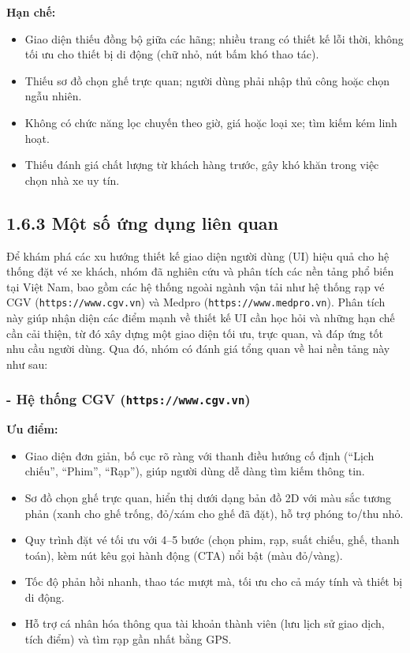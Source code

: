 \textbf{Hạn chế:}
\begin{itemize}
    \item Giao diện thiếu đồng bộ giữa các hãng; nhiều trang có thiết kế lỗi thời, không tối ưu cho thiết bị di động (chữ nhỏ, nút bấm khó thao tác).
    \item Thiếu sơ đồ chọn ghế trực quan; người dùng phải nhập thủ công hoặc chọn ngẫu nhiên.
    \item Không có chức năng lọc chuyến theo giờ, giá hoặc loại xe; tìm kiếm kém linh hoạt.
    \item Thiếu đánh giá chất lượng từ khách hàng trước, gây khó khăn trong việc chọn nhà xe uy tín.
\end{itemize}

\subsection*{1.6.3 Một số ứng dụng liên quan}

Để khám phá các xu hướng thiết kế giao diện người dùng (UI) hiệu quả cho hệ thống đặt vé xe khách, nhóm đã nghiên cứu và phân tích các nền tảng phổ biến tại Việt Nam, bao gồm các hệ thống ngoài ngành vận tải như hệ thống rạp vé CGV (\texttt{https://www.cgv.vn}) và Medpro (\texttt{https://www.medpro.vn}). Phân tích này giúp nhận diện các điểm mạnh về thiết kế UI cần học hỏi và những hạn chế cần cải thiện, từ đó xây dựng một giao diện tối ưu, trực quan, và đáp ứng tốt nhu cầu người dùng. Qua đó, nhóm có đánh giá tổng quan về hai nền tảng này như sau:
\subsubsection*{- Hệ thống CGV (\texttt{https://www.cgv.vn})}
\textbf{Ưu điểm:}
\begin{itemize}
    \item Giao diện đơn giản, bố cục rõ ràng với thanh điều hướng cố định (``Lịch chiếu'', ``Phim'', ``Rạp''), giúp người dùng dễ dàng tìm kiếm thông tin.
    \item Sơ đồ chọn ghế trực quan, hiển thị dưới dạng bản đồ 2D với màu sắc tương phản (xanh cho ghế trống, đỏ/xám cho ghế đã đặt), hỗ trợ phóng to/thu nhỏ.
    \item Quy trình đặt vé tối ưu với 4--5 bước (chọn phim, rạp, suất chiếu, ghế, thanh toán), kèm nút kêu gọi hành động (CTA) nổi bật (màu đỏ/vàng).
    \item Tốc độ phản hồi nhanh, thao tác mượt mà, tối ưu cho cả máy tính và thiết bị di động.
    \item Hỗ trợ cá nhân hóa thông qua tài khoản thành viên (lưu lịch sử giao dịch, tích điểm) và tìm rạp gần nhất bằng GPS.
\end{itemize}

